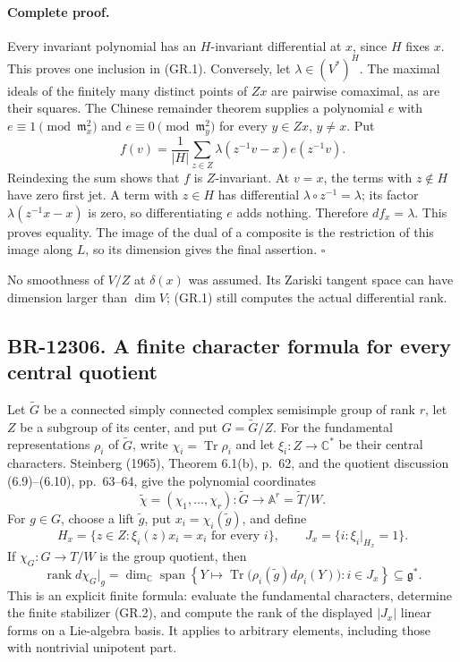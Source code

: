 \documentclass[11pt,a4paper]{article}
\theoremstyle{definition}\newtheorem{definition}[theorem]{Definition}
\theoremstyle{remark}\newtheorem{remark}[theorem]{Remark}
\begin{document}
\paragraph{Complete proof.}
Every invariant polynomial has an $H$-invariant differential at $x$,
since $H$ fixes $x$.  This proves one inclusion in (GR.1).
Conversely, let $\lambda\in(V^*)^H$.  The maximal ideals of the
finitely many distinct points of $Zx$ are pairwise comaximal, as are
their squares.  The Chinese remainder theorem supplies a polynomial
$e$ with $e\equiv1\pmod{\mathfrak m_x^2}$ and
$e\equiv0\pmod{\mathfrak m_y^2}$ for every $y\in Zx$, $y\ne x$.
Put
\[
 f(v)=\frac1{|H|}\sum_{z\in Z}
       \lambda(z^{-1}v-x)e(z^{-1}v).
\]
Reindexing the sum shows that $f$ is $Z$-invariant.  At $v=x$,
the terms with $z\notin H$ have zero first jet.  A term with
$z\in H$ has differential $\lambda\circ z^{-1}=\lambda$;
its factor $\lambda(z^{-1}x-x)$ is zero, so differentiating $e$
adds nothing.  Therefore $df_x=\lambda$.  This proves equality.
The image of the dual of a composite is the restriction of this
image along $L$, so its dimension gives the final assertion.
\(\square\)

No smoothness of $V/Z$ at $\delta(x)$ was assumed.  Its Zariski
tangent space can have dimension larger than $\dim V$; (GR.1)
still computes the actual differential rank.

\subsection{BR-12306. A finite character formula for every central quotient}
Let $\widetilde G$ be a connected simply connected complex
semisimple group of rank $r$, let $Z$ be a subgroup of its center,
and put $G=\widetilde G/Z$.  For the fundamental representations
$\rho_i$ of $\widetilde G$, write
$\chi_i=\operatorname{Tr}\rho_i$ and let $\xi_i:Z\to\mathbb C^*$
be their central characters.  Steinberg (1965), Theorem 6.1(b),
p.~62, and the quotient discussion (6.9)--(6.10), pp.~63--64,
give the polynomial coordinates
\[
 \widetilde\chi=(\chi_1,\ldots,\chi_r):
 \widetilde G\longrightarrow\mathbb A^r
       =\widetilde T/W.
\]
For $g\in G$, choose a lift $\widetilde g$, put
$x_i=\chi_i(\widetilde g)$, and define
\[
 H_x=\{z\in Z:\xi_i(z)x_i=x_i\text{ for every }i\},
 \qquad J_x=\{i:\xi_i|_{H_x}=1\}.
 \tag{GR.2}
\]
If $\chi_G:G\to T/W$ is the group quotient, then
\[
 \operatorname{rank}d\chi_G|_g
 =\dim_{\mathbb C}\operatorname{span}
 \left\{Y\longmapsto
 \operatorname{Tr}\bigl(\rho_i(\widetilde g)d\rho_i(Y)\bigr)
 :i\in J_x\right\}\subseteq\mathfrak g^*.
 \tag{GR.3}
\]
This is an explicit finite formula: evaluate the fundamental
characters, determine the finite stabilizer (GR.2), and compute
the rank of the displayed $|J_x|$ linear forms on a Lie-algebra
basis.  It applies to arbitrary elements, including those with
nontrivial unipotent part.
\end{document}
